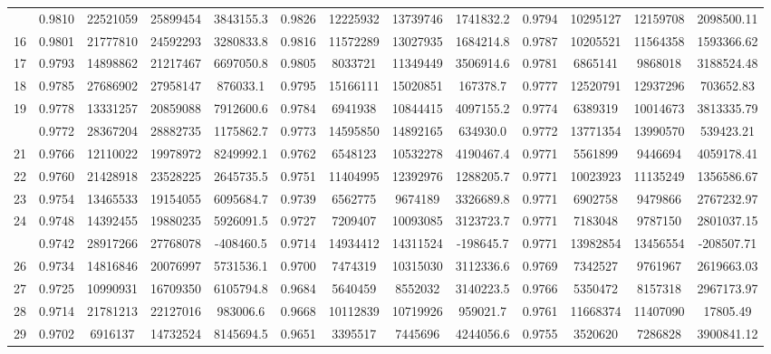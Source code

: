 \documentclass[
  12pt,
]{article}
\begin{document}
\begin{longtable}[t]{lcccccccccccc}
\addlinespace
15 & 0.9810 & 22521059 & 25899454 & 3843155.3 & 0.9826 & 12225932 & 13739746 & 1741832.2 & 0.9794 & 10295127 & 12159708 & 2098500.11\\
16 & 0.9801 & 21777810 & 24592293 & 3280833.8 & 0.9816 & 11572289 & 13027935 & 1684214.8 & 0.9787 & 10205521 & 11564358 & 1593366.62\\
17 & 0.9793 & 14898862 & 21217467 & 6697050.8 & 0.9805 & 8033721 & 11349449 & 3506914.6 & 0.9781 & 6865141 & 9868018 & 3188524.48\\
18 & 0.9785 & 27686902 & 27958147 & 876033.1 & 0.9795 & 15166111 & 15020851 & 167378.7 & 0.9777 & 12520791 & 12937296 & 703652.83\\
19 & 0.9778 & 13331257 & 20859088 & 7912600.6 & 0.9784 & 6941938 & 10844415 & 4097155.2 & 0.9774 & 6389319 & 10014673 & 3813335.79\\
\addlinespace
20 & 0.9772 & 28367204 & 28882735 & 1175862.7 & 0.9773 & 14595850 & 14892165 & 634930.0 & 0.9772 & 13771354 & 13990570 & 539423.21\\
21 & 0.9766 & 12110022 & 19978972 & 8249992.1 & 0.9762 & 6548123 & 10532278 & 4190467.4 & 0.9771 & 5561899 & 9446694 & 4059178.41\\
22 & 0.9760 & 21428918 & 23528225 & 2645735.5 & 0.9751 & 11404995 & 12392976 & 1288205.7 & 0.9771 & 10023923 & 11135249 & 1356586.67\\
23 & 0.9754 & 13465533 & 19154055 & 6095684.7 & 0.9739 & 6562775 & 9674189 & 3326689.8 & 0.9771 & 6902758 & 9479866 & 2767232.97\\
24 & 0.9748 & 14392455 & 19880235 & 5926091.5 & 0.9727 & 7209407 & 10093085 & 3123723.7 & 0.9771 & 7183048 & 9787150 & 2801037.15\\
\addlinespace
25 & 0.9742 & 28917266 & 27768078 & -408460.5 & 0.9714 & 14934412 & 14311524 & -198645.7 & 0.9771 & 13982854 & 13456554 & -208507.71\\
26 & 0.9734 & 14816846 & 20076997 & 5731536.1 & 0.9700 & 7474319 & 10315030 & 3112336.6 & 0.9769 & 7342527 & 9761967 & 2619663.03\\
27 & 0.9725 & 10990931 & 16709350 & 6105794.8 & 0.9684 & 5640459 & 8552032 & 3140223.5 & 0.9766 & 5350472 & 8157318 & 2967173.97\\
28 & 0.9714 & 21781213 & 22127016 & 983006.6 & 0.9668 & 10112839 & 10719926 & 959021.7 & 0.9761 & 11668374 & 11407090 & 17805.49\\
29 & 0.9702 & 6916137 & 14732524 & 8145694.5 & 0.9651 & 3395517 & 7445696 & 4244056.6 & 0.9755 & 3520620 & 7286828 & 3900841.12\\

\end{longtable}
\end{document}
